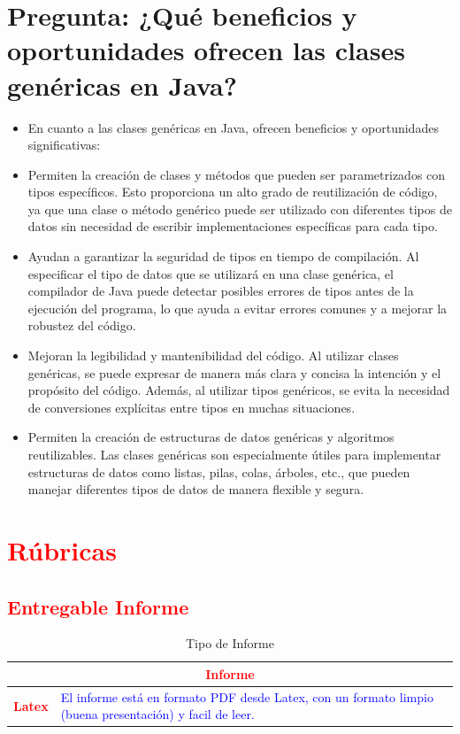 \documentclass{article}
\begin{document}
\section{Pregunta: ¿Qué beneficios y oportunidades ofrecen las clases genéricas en Java?}
	\begin{itemize}
		\item En cuanto a las clases genéricas en Java, ofrecen beneficios y oportunidades significativas:
		\item Permiten la creación de clases y métodos que pueden ser parametrizados con tipos específicos. Esto proporciona un alto grado de reutilización de código, ya que una clase o método genérico puede ser utilizado con diferentes tipos de datos sin necesidad de escribir implementaciones específicas para cada tipo.
		\item Ayudan a garantizar la seguridad de tipos en tiempo de compilación. Al especificar el tipo de datos que se utilizará en una clase genérica, el compilador de Java puede detectar posibles errores de tipos antes de la ejecución del programa, lo que ayuda a evitar errores comunes y a mejorar la robustez del código.
		\item Mejoran la legibilidad y mantenibilidad del código. Al utilizar clases genéricas, se puede expresar de manera más clara y concisa la intención y el propósito del código. Además, al utilizar tipos genéricos, se evita la necesidad de conversiones explícitas entre tipos en muchas situaciones.
		\item Permiten la creación de estructuras de datos genéricas y algoritmos reutilizables. Las clases genéricas son especialmente útiles para implementar estructuras de datos como listas, pilas, colas, árboles, etc., que pueden manejar diferentes tipos de datos de manera flexible y segura.
	\end{itemize}
	\section{\textcolor{red}{Rúbricas}}
	
	\subsection{\textcolor{red}{Entregable Informe}}
	\begin{table}[H]
		\caption{Tipo de Informe}
		\setlength{\tabcolsep}{0.5em} %
		{\renewcommand{\arraystretch}{1.5}%
		\begin{tabular}{|p{3cm}|p{12cm}|}
			\hline
			\multicolumn{2}{|c|}{\textbf{\textcolor{red}{Informe}}}  \\
			\hline 
			\textbf{\textcolor{red}{Latex}} & \textcolor{blue}{El informe está en formato PDF desde Latex,  con un formato limpio (buena presentación) y facil de leer.}   \\ 
			\hline 
			
			
		\end{tabular}
	}
	\end{table}
\end{document}
